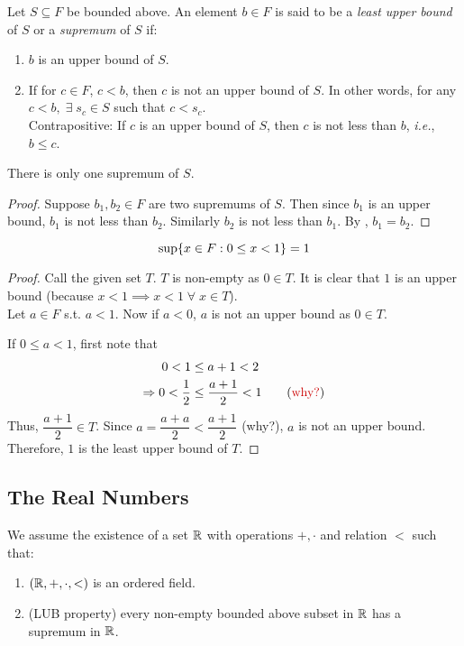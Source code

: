 \begin{defn} \label{defn:bounds:upper:supremum}
    Let $S \subseteq F$ be bounded above. An element $b \in F$ is said to be a \emph{least upper bound} of $S$ or a \emph{supremum} of $S$ if:
    \begin{enumerate}[label=(\alph*)]
        \item $b$ is an upper bound of $S$.
        \item If for $c \in F$, $c < b$, then $c$ is not an upper bound of $S$. In other words, for any $c < b, \;\exists\; s_{c} \in S$ such that $c < s_{c}$. \\
        Contrapositive: If $c$ is an upper bound of $S$, then $c$ is not less than $b$, \textit{i.e.}, $b \leq c$.
    \end{enumerate}
\end{defn}
\begin{rem}
    There is only one supremum of $S$.
\end{rem}
\begin{proof}
    Suppose $b_{1}, b_{2} \in F$ are two supremums of $S$. Then since $b_{1}$ is an upper bound, $b_{1}$ is not less than $b_{2}$. Similarly $b_{2}$ is not less than $b_{1}$. By , $b_{1} = b_{2}$.
\end{proof}

\begin{example}
    \[
        \sup \set{x \in F : 0 \leq x < 1} = 1
    \]
\end{example}
\begin{proof}
    Call the given set $T$. $T$ is non-empty as $0 \in T$. It is clear that $1$ is an upper bound (because $x < 1 \implies x < 1 \;\forall\; x \in T$). \\
    Let $a \in F$ s.t. $a < 1$. Now if $a < 0$, $a$ is not an upper bound as $0 \in T$.

    If $0 \leq a < 1$, first note that
    \begin{align*}
        0 < 1 &\leq a + 1 < 2 \\
        \implies 0 < \frac{1}{2} &\leq \frac{a+1}{2} < 1 \tag{\textcolor{exercise}{why?}}
    \end{align*}
    Thus, $\dfrac{a + 1}{2} \in T$.
    Since $a = \dfrac{a + a}{2} < \dfrac{a + 1}{2}$ (\textcolor{exercise}{why?}), $a$ is not an upper bound.
    Therefore, $1$ is the least upper bound of $T$.
\end{proof}

\subsection{The Real Numbers}
We assume the existence of a set $\mathbb{R}$ with operations $+, \cdot$ and relation $<$ such that:
\begin{enumerate}[label=(\alph*)]
    \item $(\mathbb{R}, +, \cdot, <)$ is an ordered field.
    \item \label{defn:R:LUB} (LUB property) every non-empty bounded above subset in $\mathbb{R}$ has a supremum in $\mathbb{R}$.
\end{enumerate}

